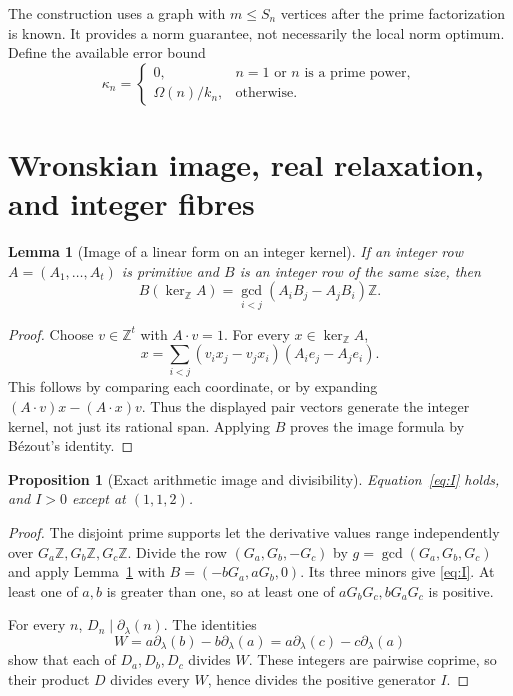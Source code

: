 \documentclass[11pt]{article}
\newtheorem{lemma}[theorem]{Lemma}
\newtheorem{proposition}[theorem]{Proposition}
\theoremstyle{definition}
\theoremstyle{remark}
\newcommand{\Z}{\mathbb Z}
\newcommand{\Om}{\Omega}
\begin{document}
The construction uses a graph with $m\le S_n$ vertices after the prime factorization is known. It provides a norm guarantee, not necessarily the local norm optimum. Define the available error bound
\begin{equation}\label{eq:kappa}
 \kappa_n=\begin{cases}
 0,&n=1\text{ or }n\text{ is a prime power},\\
 \Om(n)/k_n,&\text{otherwise}.
 \end{cases}
\end{equation}

\section{Wronskian image, real relaxation, and integer fibres}\label{sec:global}
\begin{lemma}[Image of a linear form on an integer kernel]\label{lem:minors}
If an integer row $A=(A_1,\ldots,A_t)$ is primitive and $B$ is an integer row of the same size, then
\[
 B(\ker_{\Z} A)=\gcd_{i<j}(A_iB_j-A_jB_i)\Z.
\]
\end{lemma}
\begin{proof}
Choose $v\in\Z^t$ with $A\cdot v=1$. For every $x\in\ker_{\Z}A$,
\[
 x=\sum_{i<j}(v_i x_j-v_j x_i)(A_i e_j-A_j e_i).
\]
This follows by comparing each coordinate, or by expanding $(A\cdot v)x-(A\cdot x)v$. Thus the displayed pair vectors generate the integer kernel, not just its rational span. Applying $B$ proves the image formula by B\'ezout's identity.
\end{proof}

\begin{proposition}[Exact arithmetic image and divisibility]\label{prop:image}
Equation~\eqref{eq:I} holds, and $I>0$ except at $(1,1,2)$.
\end{proposition}
\begin{proof}
The disjoint prime supports let the derivative values range independently over $G_a\Z,G_b\Z,G_c\Z$. Divide the row $(G_a,G_b,-G_c)$ by $g=\gcd(G_a,G_b,G_c)$ and apply Lemma~\ref{lem:minors} with $B=(-bG_a,aG_b,0)$. Its three minors give \eqref{eq:I}. At least one of $a,b$ is greater than one, so at least one of $aG_bG_c,bG_aG_c$ is positive.

For every $n$, $D_n\mid\partial_\lambda(n)$. The identities
\[
 W=a\partial_\lambda(b)-b\partial_\lambda(a)
   =a\partial_\lambda(c)-c\partial_\lambda(a)
\]
show that each of $D_a,D_b,D_c$ divides $W$. These integers are pairwise coprime, so their product $D$ divides every $W$, hence divides the positive generator $I$.
\end{proof}
\end{document}
